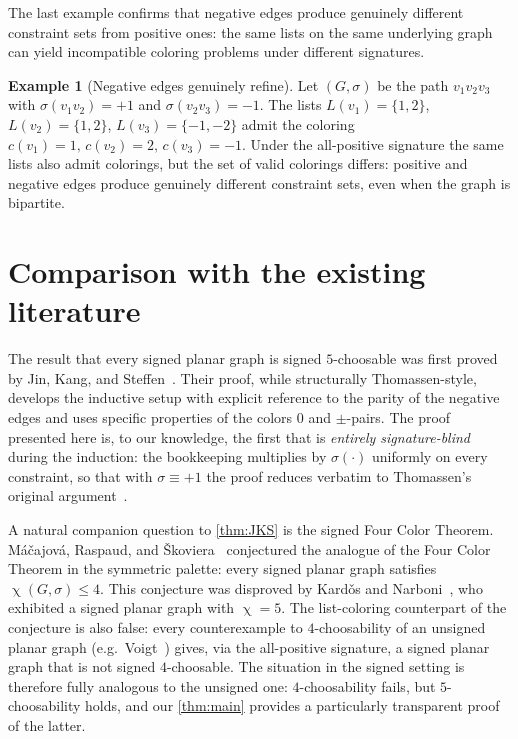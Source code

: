 \documentclass[11pt,a4paper]{article}
\theoremstyle{plain}
\theoremstyle{definition}
\newtheorem{example}[theorem]{Example}
\DeclareMathOperator{\chia}{\chi}
\newcommand{\Gs}{(G,\sigma)}
\begin{document}
The last example confirms that negative edges produce genuinely
different constraint sets from positive ones: the same lists on the
same underlying graph can yield incompatible coloring problems
under different signatures.

\begin{example}[Negative edges genuinely refine]\label{ex:negative}
Let $\Gs$ be the path $v_1v_2v_3$ with $\sigma(v_1v_2)=+1$ and
$\sigma(v_2v_3)=-1$. The lists $L(v_1)=\{1,2\}$, $L(v_2)=\{1,2\}$,
$L(v_3)=\{-1,-2\}$ admit the coloring
$c(v_1)=1,\,c(v_2)=2,\,c(v_3)=-1$. Under the all-positive signature
the same lists also admit colorings, but the set of valid
colorings differs: positive and negative edges produce genuinely
different constraint sets, even when the graph is bipartite.
\end{example}

\section{Comparison with the existing literature}\label{sec:literature}

The result that every signed planar graph is signed $5$-choosable
was first proved by Jin, Kang, and
Steffen~\cite{JinKangSteffen2016}. Their proof, while structurally
Thomassen-style, develops the inductive setup with explicit
reference to the parity of the negative edges and uses specific
properties of the colors $0$ and $\pm$-pairs. The proof presented
here is, to our knowledge, the first that is \emph{entirely
signature-blind} during the induction: the bookkeeping multiplies
by $\sigma(\cdot)$ uniformly on every constraint, so that with
$\sigma\equiv+1$ the proof reduces verbatim to Thomassen's original
argument~\cite{Thomassen1994}.

A natural companion question to \cref{thm:JKS} is the signed Four
Color Theorem. M\'a\v{c}ajov\'a, Raspaud, and
\v{S}koviera~\cite{MRS2016} conjectured the analogue of the Four
Color Theorem in the symmetric palette: every signed planar graph
satisfies $\chia\Gs\le 4$. This conjecture was disproved by
Kard\v{o}s and Narboni~\cite{KardosNarboni2021}, who exhibited a
signed planar graph with $\chia=5$. The list-coloring counterpart
of the conjecture is also false: every counterexample to
$4$-choosability of an unsigned planar graph (e.g.\
Voigt~\cite{Voigt1993}) gives, via the all-positive signature, a
signed planar graph that is not signed $4$-choosable. The situation
in the signed setting is therefore fully analogous to the unsigned
one: $4$-choosability fails, but $5$-choosability holds, and our
\cref{thm:main} provides a particularly transparent proof of the
latter.
\end{document}
